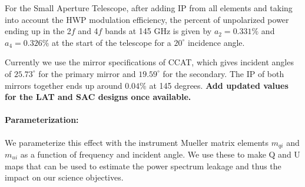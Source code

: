 For the Small Aperture Telescope, after adding IP from all elements and taking into account the HWP modulation efficiency,
the percent of unpolarized power ending up in the 2$f$ and 4$f$ bands at 145 GHz is given by $a_2 = 0.331\%$ and $a_4 = 0.326\%$ 
at the start of the telescope for a $20^\circ$ incidence angle.


Currently we use the mirror specifications of CCAT, which gives incident angles of $25.73^\circ$ for the primary mirror 
and $19.59^\circ$ for the secondary. The IP of both mirrors together ends up around $0.04\%$ at 145 degrees. \textbf{Add updated values for the LAT and SAC designs once available.}

\paragraph{Parameterization:}
We parameterize this effect with the instrument Mueller matrix elements $m_{qi}$ and $m_{ui}$ as a function of frequency and incident angle. We use these to make Q and U maps that can be used to estimate the power spectrum leakage and thus the impact on our science objectives.

